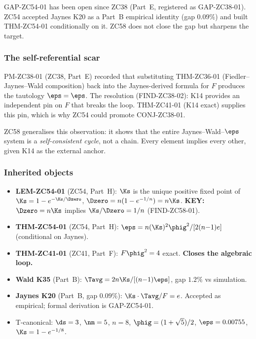 \documentclass[12pt, a4paper]{article}
\begin{document}
GAP-ZC54-01 has been open since ZC38 (Part~E, registered as
GAP-ZC38-01).  ZC54 accepted Jaynes K20 as a Part~B empirical
identity (gap $0.09\%$) and built THM-ZC54-01 conditionally on it.
ZC58 does not close the gap but sharpens the target.

\subsubsection{The self-referential scar}

PM-ZC38-01 (ZC38, Part~E) recorded that substituting
THM-ZC36-01 (Fiedler--Jaynes--Wald composition) back
into the Jaynes-derived formula for $F$
produces the tautology $\eps=\eps$.
The resolution (FIND-ZC38-02): K14 provides an independent pin
on $F$ that breaks the loop.  THM-ZC41-01 (K14 exact) supplies
this pin, which is why ZC54 could promote CONJ-ZC38-01.

ZC58 generalises this observation: it shows that the entire
Jaynes--Wald--$\eps$ system is a \emph{self-consistent cycle},
not a chain.  Every element implies every other, given K14 as
the external anchor.

\subsubsection{Inherited objects}

\begin{itemize}[leftmargin=2em, noitemsep]
\item \textbf{LEM-ZC54-01} (ZC54, Part~H):
  $\Ks$ is the unique positive fixed point of
  $\Ks=1-e^{-\Ks/\Dzero}$, $\Dzero=n(1-e^{-1/n})=n\Ks$.
  \textbf{KEY:} $\Dzero=n\Ks$ implies $\Ks/\Dzero=1/n$ (FIND-ZC58-01).
\item \textbf{THM-ZC54-01} (ZC54, Part~H):
  $\eps=n(\Ks)^2\phig^2/[2(n{-}1)e]$ (conditional on Jaynes).
\item \textbf{THM-ZC41-01} (ZC41, Part~F):
  $F\phig^2=4$ exact. \textbf{Closes the algebraic loop.}
\item \textbf{Wald K35} (Part~B):
  $\Tavg=2n\Ks/[(n{-}1)\eps]$, gap $1.2\%$ vs simulation.
\item \textbf{Jaynes K20} (Part~B, gap $0.09\%$):
  $\Ks\cdot\Tavg/F=e$.
  Accepted as empirical; formal derivation is GAP-ZC54-01.
\item T-canonical: $\ds=3$, $\nm=5$, $n=8$,
  $\phig=(1+\sqrt{5})/2$, $\eps=0.00755$, $\Ks=1-e^{-1/8}$.
\end{itemize}

\end{document}
